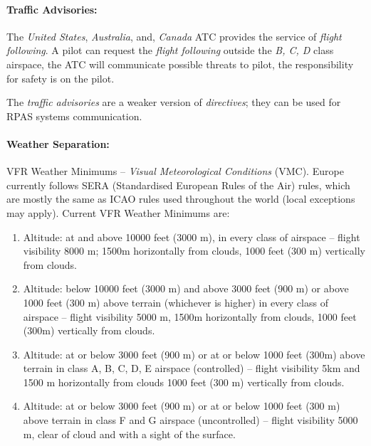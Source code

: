\paragraph{Traffic Advisories:} The \emph{United States}, \emph{Australia}, and,  \emph{Canada} ATC provides the service of \emph{flight following}. A pilot can request the \emph{flight following} outside the \emph{B, C, D} class airspace, the ATC will communicate possible threats to pilot, the responsibility for safety is on the pilot.

\begin{note}
    The \emph{traffic advisories} are a weaker version of \emph{directives}; they can be used for RPAS systems communication.
\end{note}


\paragraph{Weather Separation:} VFR Weather Minimums – \emph{Visual Meteorological Conditions} (VMC).  Europe currently follows SERA (Standardised European Rules of the Air) rules, which are mostly the same as ICAO rules used throughout the world (local exceptions may apply). Current VFR Weather Minimums are:

\begin{enumerate}
    \item Altitude: at and above 10000 feet (3000 m), in every class of airspace – flight visibility 8000 m; 1500m horizontally from clouds, 1000 feet (300 m) vertically from clouds.
    
    \item Altitude: below 10000 feet (3000 m) and above 3000 feet (900 m) or above 1000 feet  (300 m) above terrain (whichever is higher) in every class of airspace – flight visibility 5000 m, 1500m horizontally from clouds, 1000 feet (300m) vertically from clouds.

    \item Altitude: at or below 3000 feet (900 m) or at or below 1000 feet (300m) above terrain in class A, B, C, D, E airspace (controlled) – flight visibility 5km and 1500 m horizontally from clouds 1000 feet (300 m) vertically from clouds.

    \item Altitude: at or below 3000 feet (900 m) or at or below 1000 feet (300 m) above terrain in class F and G airspace (uncontrolled) – flight visibility 5000 m, clear of cloud and with a sight of the surface. 
\end{enumerate}

